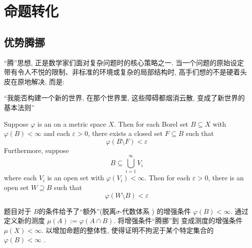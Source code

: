 \documentclass[../main.tex]{subfiles}
\begin{document}
\ifSubfilesClassLoaded{

    \tableofcontents
    
}{}

\chapter{ 命题转化 }

\section{优势腾挪}
``腾''思想, 正是数学家们面对复杂问题时的核心策略之一. 当一个问题的原始设定带有令人不悦的限制、非标准的环境或复杂的局部结构时, 高手们想的不是硬着头皮在原地解决, 而是:

``我能否构建一个新的世界, 在那个世界里, 这些障碍都烟消云散, 变成了新世界的基本法则''
\begin{theorem}{}{}
    Suppose \(   \varphi   \) is an   on a  metric space \(  X  \). Then for each Borel set \(  B\subseteq X  \) with \(   \varphi \left( B \right)< \infty   \) and each \(   \varepsilon > 0  \), there exists a closed set \(  F\subseteq B  \) such that \[
     \varphi \left( B\setminus F \right)<  \varepsilon  
    \]      Furthermore, suppose \[
    B\subseteq \bigcup _{i= 1}^{\infty}V_{i}
    \]where each \(  V_{i}  \) is an open set with \(   \varphi \left( V_{i} \right)< \infty   \). Then for each \(   \varepsilon > 0  \), there is an open set \(  W\supseteq B  \) such that \[
     \varphi \left( W\setminus B \right)<  \varepsilon  
    \]    
\end{theorem}
\begin{note}
    题目对于 \(  B  \)的条件给予了``额外''(脱离\(   \sigma   \)-代数体系 ) 的增强条件 \(   \varphi \left( B \right)< \infty   \). 通过定义新的测度 \(  \mu \left( A \right):=  \varphi \left( A\cap B \right)    \). 将增强条件``腾挪''到 变成测度的增强条件 \(  \mu \left( X \right)< \infty   \). 以增加命题的整体性, 使得证明不拘泥于某个特定集合的 \(   \varphi \left( B \right)< \infty   \) .
\end{note}
\end{document}
